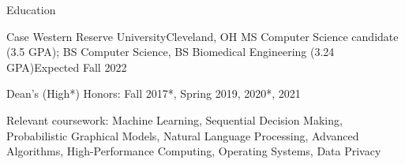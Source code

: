 \begin{rsection}{Education}
\begin{ritemize}
{Case Western Reserve University}{Cleveland, OH}
{MS Computer Science candidate (3.5 GPA); BS Computer Science, BS Biomedical Engineering (3.24 GPA)}{Expected Fall 2022}
	\item Dean's (High*) Honors: Fall 2017*, Spring 2019, 2020*, 2021
	\item Relevant coursework:
	Machine Learning,
	Sequential Decision Making,
	Probabilistic Graphical Models,
	Natural Language Processing,
	Advanced Algorithms,
	High-Performance Computing,
	Operating Systems,
	Data Privacy
\end{ritemize}
\end{rsection}